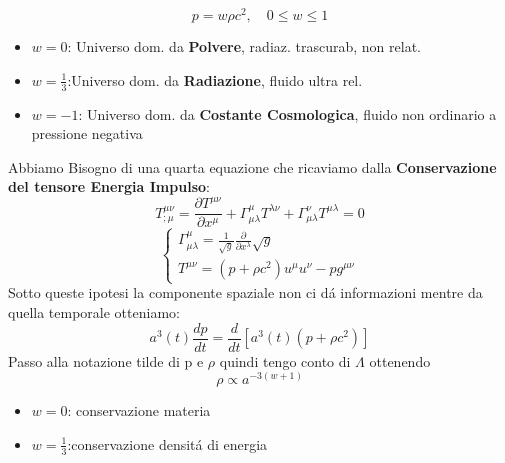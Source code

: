 \documentclass[12pt, a4paper]{article}
\begin{document}
\begin{equation}
    p = w \rho c^2,\quad 0 \leq w \leq 1
\end{equation}
\begin{itemize}
    \item $w=0$: Universo dom. da \textbf{Polvere}, radiaz. trascurab, non relat.
    \item $w=\frac{1}{3}$:Universo dom. da \textbf{Radiazione}, fluido ultra rel.
    \item $w=-1$: Universo dom. da \textbf{Costante Cosmologica}, fluido non ordinario a pressione negativa
\end{itemize}
Abbiamo Bisogno di una quarta equazione che ricaviamo dalla \textbf{Conservazione del tensore Energia Impulso}:
\begin{equation}
    T^{\mu\nu}_{;\mu} = \frac{\partial T^{\mu\nu}}{\partial x^\mu}+\Gamma^\mu_{\mu \lambda} T^{\lambda\nu}+\Gamma^\nu_{\mu\lambda} T^{\mu\lambda}=0
\end{equation}
\begin{equation}
  \begin{cases}
         \Gamma^\mu_{\mu \lambda}=\frac{1}{\sqrt{g}} \frac{\partial}{\partial x^\lambda} \sqrt{g}
         \\
        T^{\mu \nu}=(p+\rho c^2)u^\mu u^\nu-pg^{\mu\nu}
    \end{cases}
\end{equation}
Sotto queste ipotesi la componente spaziale non ci d\'{a} informazioni mentre da quella temporale otteniamo:
\begin{equation}
    a^3(t) \frac{dp}{dt}=\frac{d}{dt}[a^3(t)(p+\rho c^2)]
\end{equation}
Passo alla notazione tilde di p e $\rho$ quindi tengo conto di $\Lambda$ ottenendo
\begin{equation}
    \rho \propto a^{-3(w+1)}
\end{equation}
\begin{itemize}
    \item $w=0$: conservazione materia
    \item $w=\frac{1}{3}$:conservazione densit\'{a} di energia
\end{itemize}
\end{document}
